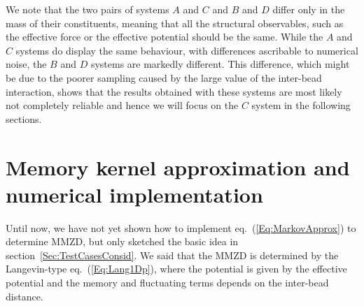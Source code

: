 \documentclass[10pt,a4paper]{book}
\theoremstyle{definition}
\begin{document}
We note that the two pairs of systems $A$ and $C$ and $B$ and $D$ differ only in the mass of their constituents, meaning that all the structural observables, such as the effective force or the effective potential should be the same. While the $A$ and $C$ systems do display the same behaviour, with differences ascribable to numerical noise, the $B$ and $D$ systems are markedly different. This difference, which might be due to the poorer sampling caused by the large value of the inter-bead interaction, shows that the results obtained with these systems are most likely not completely reliable and hence we will focus on the $C$ system in the following sections. 

\section{Memory kernel approximation and numerical implementation}
Until now, we have not yet shown how to implement eq.~(\ref{Eq:MarkovApprox}) to determine MMZD, but only sketched the basic idea in section~\ref{Sec:TestCasesConsid}. We said that the MMZD is determined by the Langevin-type eq.~(\ref{Eq:Lang1Dp}), where the potential is given by the effective potential and the memory and fluctuating terms depends on the inter-bead distance. 
\end{document}
